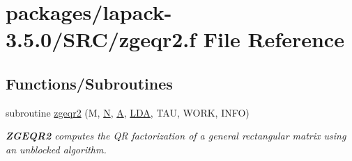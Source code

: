 \hypertarget{zgeqr2_8f}{}\section{packages/lapack-\/3.5.0/\+S\+R\+C/zgeqr2.f File Reference}
\label{zgeqr2_8f}
\subsection*{Functions/\+Subroutines}
\begin{DoxyCompactItemize}
\item 
subroutine \hyperlink{group__complex16GEcomputational_ga5b3713deac5bd2bda6844fa1d896f162}{zgeqr2} (M, \hyperlink{polmisc_8c_a0240ac851181b84ac374872dc5434ee4}{N}, \hyperlink{classA}{A}, \hyperlink{example__user_8c_ae946da542ce0db94dced19b2ecefd1aa}{L\+D\+A}, T\+A\+U, W\+O\+R\+K, I\+N\+F\+O)
\begin{DoxyCompactList}\small\item\em {\bfseries Z\+G\+E\+Q\+R2} computes the Q\+R factorization of a general rectangular matrix using an unblocked algorithm. \end{DoxyCompactList}\end{DoxyCompactItemize}
